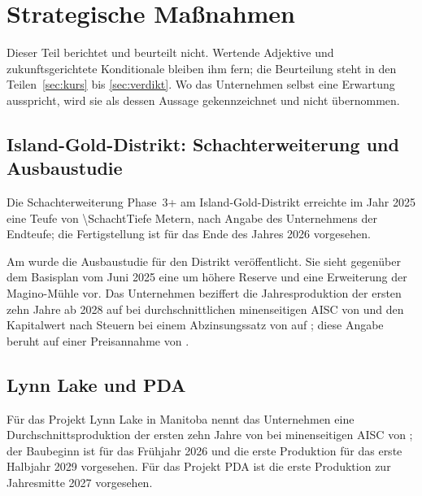 \section{Strategische Ma{\ss}nahmen}
\label{sec:strategie}

Dieser Teil berichtet und beurteilt nicht. Wertende Adjektive und
zukunftsgerichtete Konditionale bleiben ihm fern; die Beurteilung steht in
den Teilen~\ref{sec:kurs} bis \ref{sec:verdikt}. Wo das Unternehmen selbst
eine Erwartung ausspricht, wird sie als dessen Aussage gekennzeichnet und
nicht \"ubernommen.

\subsection{Island-Gold-Distrikt: Schachterweiterung und Ausbaustudie}

Die Schachterweiterung Phase~3+ am Island-Gold-Distrikt erreichte im Jahr
2025 eine Teufe von \num{\SchachtTiefe} Metern, nach Angabe des Unternehmens
\Pct{\SchachtAnteil} der Endteufe; die Fertigstellung ist f\"ur das Ende des Jahres 2026
vorgesehen.

Am  wurde die Ausbaustudie f\"ur den Distrikt
ver\"offentlicht. Sie sieht gegen\"uber dem Basisplan vom Juni 2025 eine um
\Pct{\IGDReservenPlus} h\"ohere Reserve und eine Erweiterung der Magino-M\"uhle vor. Das
Unternehmen beziffert die Jahresproduktion der ersten zehn Jahre ab 2028 auf
\Unzen{\IGDProduktion} bei durchschnittlichen minenseitigen AISC von
\JeUnze{\IGDAISC} und den Kapitalwert nach Steuern bei einem Abzinsungssatz
von \Pct{\IGDZins} auf \MrdUSD{\IGDKapitalwert}; diese Angabe beruht auf einer
Preisannahme von \JeUnze{\IGDGoldpreis}.

\subsection{Lynn Lake und PDA}

F\"ur das Projekt Lynn Lake in Manitoba nennt das Unternehmen eine
Durchschnittsproduktion der ersten zehn Jahre von \Unzen{\LynnLakeProduktion}
bei minenseitigen AISC von \JeUnze{\LynnLakeAISC}; der Baubeginn ist f\"ur das
Fr\"uhjahr 2026 und die erste Produktion f\"ur das erste Halbjahr 2029
vorgesehen. F\"ur das Projekt PDA
ist die erste Produktion zur Jahresmitte 2027
vorgesehen.

